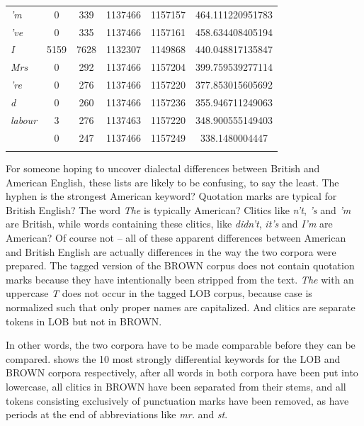 \begin{table}
{\begin{tabular}[t]{l *{2}{S[table-format=4]} *{2}{S[table-format=7]} S[table-format=6.2]}
\textit{'m} & 0 & 339 & 1137466 & 1157157 & 464.111220951783 \\
\textit{'ve} & 0 & 335 & 1137466 & 1157161 & 458.634408405194 \\
\textit{I} & 5159 & 7628 & 1132307 & 1149868 & 440.048817135847 \\
\textit{Mrs} & 0 & 292 & 1137466 & 1157204 & 399.759539277114 \\
\textit{'re} & 0 & 276 & 1137466 & 1157220 & 377.853015605692 \\
\textit{d} & 0 & 260 & 1137466 & 1157236 & 355.946711249063 \\
\textit{labour} & 3 & 276 & 1137463 & 1157220 & 348.900555149403 \\
\textit{~} & 0 & 247 & 1137466 & 1157249 & 338.1480004447 \\
\lspbottomrule
\end{tabular}}
\end{table}

For someone hoping to uncover dialectal differences between British  and American  English, these lists are likely to be confusing, to say the least. The hyphen is the strongest American keyword?  Quotation marks are typical for British English? The word \textit{The} is typically American? Clitics  like \textit{n't}, \textit{'s} and \textit{'m} are British, while words containing these clitics,  like \textit{didn't}, \textit{it's} and \textit{I'm} are American? Of course not -- all of these apparent differences between American  and British English are actually differences in the way the two corpora were prepared. The tagged version of the BROWN  corpus does not contain quotation marks because they have intentionally been stripped from the text. \textit{The} with an uppercase \textit{T} does not occur in the tagged LOB  corpus, because case is normalized such that only proper names are capitalized. And clitics  are separate tokens  in LOB but not in  BROWN.

In other words, the two corpora have to be made comparable before they can be compared.  shows the 10 most strongly differential keywords  for the LOB  and BROWN  corpora respectively, after all words in both corpora have been put into lowercase, all clitics  in BROWN  have been separated from their stems,  and all tokens  consisting exclusively of punctuation marks have been removed, as have periods at the end of abbreviations like \textit{mr.} and \textit{st}.


